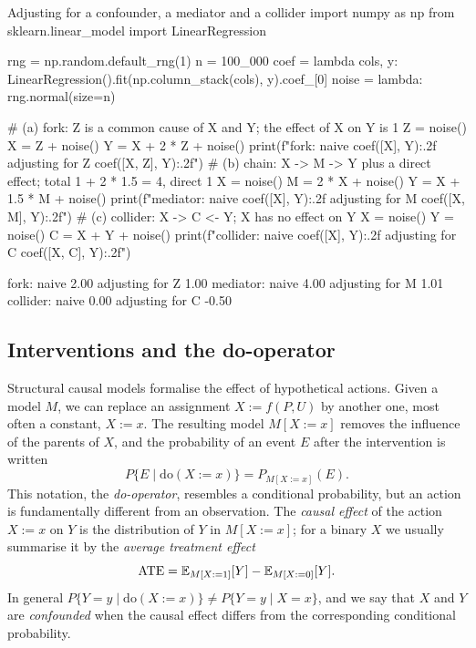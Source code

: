 \begin{pylisting}[label={lst:adjustment}]{Adjusting for a confounder, a mediator and a collider}
import numpy as np
from sklearn.linear_model import LinearRegression

rng = np.random.default_rng(1)
n = 100_000
coef = lambda cols, y: LinearRegression().fit(np.column_stack(cols), y).coef_[0]
noise = lambda: rng.normal(size=n)

# (a) fork: Z is a common cause of X and Y; the effect of X on Y is 1
Z = noise()
X = Z + noise()
Y = X + 2 * Z + noise()
print(f"fork:     naive {coef([X], Y):.2f}   adjusting for Z {coef([X, Z], Y):.2f}")
# (b) chain: X -> M -> Y plus a direct effect; total 1 + 2 * 1.5 = 4, direct 1
X = noise()
M = 2 * X + noise()
Y = X + 1.5 * M + noise()
print(f"mediator: naive {coef([X], Y):.2f}   adjusting for M {coef([X, M], Y):.2f}")
# (c) collider: X -> C <- Y; X has no effect on Y
X = noise()
Y = noise()
C = X + Y + noise()
print(f"collider: naive {coef([X], Y):.2f}   adjusting for C {coef([X, C], Y):.2f}")
\end{pylisting}
\begin{pyoutput}
fork:     naive 2.00   adjusting for Z 1.00
mediator: naive 4.00   adjusting for M 1.01
collider: naive 0.00   adjusting for C -0.50
\end{pyoutput}

\subsection{Interventions and the do-operator}

Structural causal models formalise the effect of hypothetical actions. Given a model $M$, we can
replace an assignment $X:=f(P,U)$ by another one, most often a constant, $X:=x$. The resulting
model $M[X:=x]$ removes the influence of the parents of $X$, and the probability of an event $E$
after the intervention is written
\begin{equation}
  P\{E\mid\mathrm{do}(X:=x)\}=P_{M[X:=x]}(E).
\end{equation}
This notation, the \emph{do-operator}, resembles a conditional probability, but an action is
fundamentally different from an observation. The \emph{causal effect} of the action $X:=x$ on $Y$
is the distribution of $Y$ in $M[X:=x]$; for a binary $X$ we usually summarise it by the
\emph{average treatment effect}
\begin{equation}
  \mathrm{ATE}=\mathbb{E}_{M[X:=1]}[Y]-\mathbb{E}_{M[X:=0]}[Y].
\end{equation}
In general $P\{Y=y\mid\mathrm{do}(X:=x)\}\neq P\{Y=y\mid X=x\}$, and we say that $X$ and $Y$ are
\emph{confounded} when the causal effect differs from the corresponding conditional probability.

